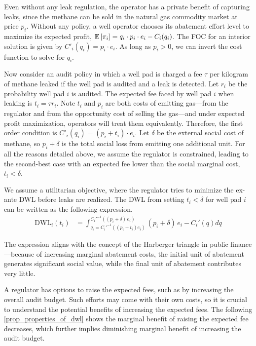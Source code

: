 Even without any leak regulation, the operator has a private benefit of capturing leaks, since the methane can be sold in the natural gas commodity market at price \(p_i\).
Without any policy, a well operator chooses its abatement effort level to maximize its expected profit,
\(\operatorname{\mathbb{E}}\left[\pi_i\right] = q_i \cdot p_i \cdot e_i - C_i(q_i)\).
The \gls{FOC} for an interior solution is given by \(C'_i(q_i) = p_i \cdot e_i\).
As long as \(p_i > 0\), we can invert the cost function to solve for \(q_i\).

Now consider an audit policy in which a well pad is charged a fee \(\tau\) per kilogram of methane leaked if the well pad is audited and a leak is detected.
Let \(r_i\) be the probability well pad \(i\) is audited.
The expected fee faced by well pad \(i\) when leaking is \(t_i = \tau r_i \).
Note \(t_i\) and \(p_i\) are both costs of emitting gas---from the regulator and from the opportunity cost of selling the gas---and under expected profit maximization, operators will treat them equivalently.
Therefore, the first order condition is \(C'_i(q_i) = (p_i + t_i) \cdot e_i\).
Let \(\delta\) be the external social cost of methane, so \(p_i + \delta\) is the total social loss from emitting one additional unit.
For all the reasons detailed above, we assume the regulator is constrained, leading to the second-best case with an expected fee lower than the social marginal cost, \(t_i < \delta\).

We assume a utilitarian objective, where the regulator tries to minimize the ex-ante \gls{DWL} before leaks are realized.
The \gls{DWL} from setting \(t_i < \delta\) for well pad \(i\) can be written as the following expression.
\begin{align*}
\text{DWL}_i(t_i) &=
\int_{q_i={C_i'}^{-1}((p_i + t_i) e_i)}^{{C_i'}^{-1}((p_i + \delta) \, e_i)}
 (p_i + \delta)\, e_i - C_i'(q)  d q
\end{align*}

The expression aligns with the concept of the Harberger triangle in public finance---because of increasing marginal abatement costs, the initial unit of abatement generates significant social value, while the final unit of abatement contributes very little.

A regulator has options to raise the expected fees, such as by increasing the overall audit budget.
Such efforts may come with their own costs, so it is crucial to understand the potential benefits of increasing the expected fees.
The following \autoref{prop_properties_of_dwl} shows the marginal benefit of raising the expected fee decreases, which further implies diminishing marginal benefit of increasing the audit budget.

